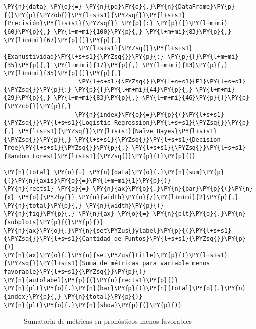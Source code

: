     \begin{tcolorbox}[breakable, size=fbox, boxrule=1pt, pad at break*=1mm,colback=cellbackground, colframe=cellborder]
\begin{Verbatim}[commandchars=\\\{\}]
\PY{n}{data} \PY{o}{=} \PY{n}{pd}\PY{o}{.}\PY{n}{DataFrame}\PY{p}{(}\PY{p}{\PYZob{}}\PY{l+s+s1}{\PYZsq{}}\PY{l+s+s1}{Precisión}\PY{l+s+s1}{\PYZsq{}} \PY{p}{:} \PY{p}{[}\PY{l+m+mi}{60}\PY{p}{,} \PY{l+m+mi}{100}\PY{p}{,} \PY{l+m+mi}{83}\PY{p}{,} \PY{l+m+mi}{67}\PY{p}{]}\PY{p}{,}
                     \PY{l+s+s1}{\PYZsq{}}\PY{l+s+s1}{Exahustividad}\PY{l+s+s1}{\PYZsq{}}\PY{p}{:} \PY{p}{[}\PY{l+m+mi}{35}\PY{p}{,} \PY{l+m+mi}{17}\PY{p}{,} \PY{l+m+mi}{83}\PY{p}{,} \PY{l+m+mi}{35}\PY{p}{]}\PY{p}{,}
                     \PY{l+s+s1}{\PYZsq{}}\PY{l+s+s1}{F1}\PY{l+s+s1}{\PYZsq{}}\PY{p}{:} \PY{p}{[}\PY{l+m+mi}{44}\PY{p}{,} \PY{l+m+mi}{29}\PY{p}{,} \PY{l+m+mi}{83}\PY{p}{,} \PY{l+m+mi}{46}\PY{p}{]}\PY{p}{\PYZcb{}}\PY{p}{,}
                    \PY{n}{index}\PY{o}{=}\PY{p}{(}\PY{l+s+s1}{\PYZsq{}}\PY{l+s+s1}{Logistic Regression}\PY{l+s+s1}{\PYZsq{}}\PY{p}{,} \PY{l+s+s1}{\PYZsq{}}\PY{l+s+s1}{Naïve Bayes}\PY{l+s+s1}{\PYZsq{}}\PY{p}{,} \PY{l+s+s1}{\PYZsq{}}\PY{l+s+s1}{Decision Tree}\PY{l+s+s1}{\PYZsq{}}\PY{p}{,} \PY{l+s+s1}{\PYZsq{}}\PY{l+s+s1}{Random Forest}\PY{l+s+s1}{\PYZsq{}}\PY{p}{)}\PY{p}{)}

\PY{n}{total} \PY{o}{=} \PY{n}{data}\PY{o}{.}\PY{n}{sum}\PY{p}{(}\PY{n}{axis}\PY{o}{=}\PY{l+m+mi}{1}\PY{p}{)}
\PY{n}{rects1} \PY{o}{=} \PY{n}{ax}\PY{o}{.}\PY{n}{bar}\PY{p}{(}\PY{n}{x} \PY{o}{\PYZhy{}} \PY{n}{width}\PY{o}{/}\PY{l+m+mi}{2}\PY{p}{,} \PY{n}{total}\PY{p}{,} \PY{n}{width}\PY{p}{)}
\PY{n}{fig}\PY{p}{,} \PY{n}{ax} \PY{o}{=} \PY{n}{plt}\PY{o}{.}\PY{n}{subplots}\PY{p}{(}\PY{p}{)}
\PY{n}{ax}\PY{o}{.}\PY{n}{set\PYZus{}ylabel}\PY{p}{(}\PY{l+s+s1}{\PYZsq{}}\PY{l+s+s1}{Cantidad de Puntos}\PY{l+s+s1}{\PYZsq{}}\PY{p}{)}
\PY{n}{ax}\PY{o}{.}\PY{n}{set\PYZus{}title}\PY{p}{(}\PY{l+s+s1}{\PYZsq{}}\PY{l+s+s1}{Suma de métricas para variable menos favorable}\PY{l+s+s1}{\PYZsq{}}\PY{p}{)}
\PY{n}{autolabel}\PY{p}{(}\PY{n}{rects1}\PY{p}{)}
\PY{n}{plt}\PY{o}{.}\PY{n}{bar}\PY{p}{(}\PY{n}{total}\PY{o}{.}\PY{n}{index}\PY{p}{,} \PY{n}{total}\PY{p}{)}
\PY{n}{plt}\PY{o}{.}\PY{n}{show}\PY{p}{(}\PY{p}{)}
\end{Verbatim}
\end{tcolorbox}

\begin{center}
    	\begin{figure}[htb]
	\centering
	\caption{Sumatoria de métricas en pronósticos menos favorables}
	\label{fig:smpmf}
	\end{figure}
\end{center}
    
